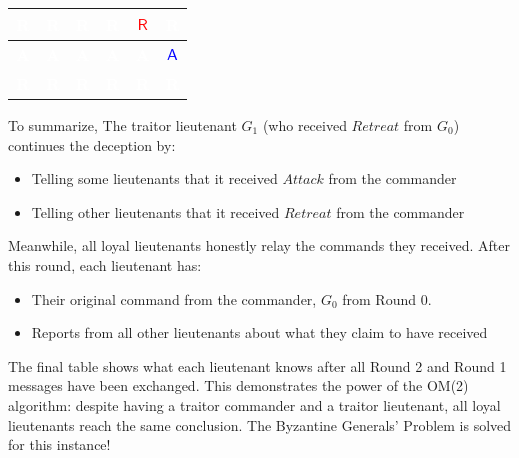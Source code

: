 \documentclass[11pt]{article}
\newcommand{\cmdA}{\ensuremath{\mathsf{A}}} %
\newcommand{\cmdR}{\ensuremath{\mathsf{R}}} %
\newcommand{\gen}[1]{\ensuremath{G_{#1}}}
\begin{document}
\begin{center}
\begin{tabular}{c|c|c|c|c|c}
    \hline
    \cellcolor{red!75}\textbf{\textcolor{white}{R}} & \cellcolor{red!75}\textbf{\textcolor{white}{R}} & \cellcolor{red!75}\textbf{\textcolor{white}{R}} & \cellcolor{red!75}\textbf{\textcolor{white}{R}} & \cellcolor{yellow!30}\textbf{\textcolor{red}{\cmdR}} & \cellcolor{red!75}\textbf{\textcolor{white}{R}} \\
    \hline
    \cellcolor{blue!75}\textbf{\textcolor{white}{A}} & \cellcolor{blue!75}\textbf{\textcolor{white}{A}} & \cellcolor{blue!75}\textbf{\textcolor{white}{A}} & \cellcolor{blue!75}\textbf{\textcolor{white}{A}} & \cellcolor{blue!75}\textbf{\textcolor{white}{A}} & \cellcolor{yellow!30}\textbf{\textcolor{blue}{\cmdA}} \\
    \hline
    \hline
    \cellcolor{red!45}\textbf{\textcolor{white}{R}} & \cellcolor{red!75}\textbf{\textcolor{white}{R}} & \cellcolor{red!75}\textbf{\textcolor{white}{R}} & \cellcolor{red!75}\textbf{\textcolor{white}{R}} & \cellcolor{red!75}\textbf{\textcolor{white}{R}} & \cellcolor{red!75}\textbf{\textcolor{white}{R}} \\
\end{tabular}
\label{tab:traitor_commander_final_table}
\end{center}

\par\vspace{0.3em}


\justifying
To summarize, The traitor lieutenant $\gen{1}$ (who received $Retreat$ from $\gen{0}$) continues the deception by:
\begin{itemize}
    \item Telling some lieutenants that it received $Attack$ from the commander
    \item Telling other lieutenants that it received $Retreat$ from the commander
\end{itemize}

Meanwhile, all loyal lieutenants honestly relay the commands they received. After this round, each lieutenant has:
\begin{itemize}
    \item Their original command from the commander, $\gen{0}$ from Round 0.
    \item Reports from all other lieutenants about what they claim to have received
\end{itemize}

The final table shows what each lieutenant knows after all Round 2 and Round 1 messages have been exchanged.
This demonstrates the power of the OM(2) algorithm: despite having a traitor commander and a traitor lieutenant, all loyal lieutenants reach the same conclusion. The Byzantine Generals' Problem is solved for this instance!
\end{document}
